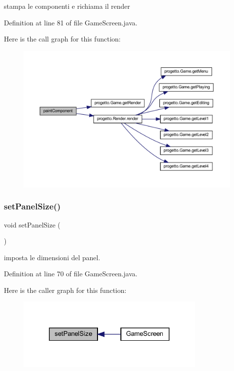 stampa le componenti e richiama il render 



Definition at line 81 of file Game\+Screen.\+java.

Here is the call graph for this function\+:\nopagebreak
\begin{figure}[H]
\begin{center}
\leavevmode
\includegraphics[width=350pt]{classprogetto_1_1_game_screen_aac9233d06f3c093fc37139d7d2b258f6_cgraph}
\end{center}
\end{figure}
\mbox{\label{classprogetto_1_1_game_screen_aa43131fafd2ebfcce65253a669a29493}} 
\subsubsection{\texorpdfstring{set\+Panel\+Size()}{setPanelSize()}}
{\footnotesize\ttfamily void set\+Panel\+Size (\begin{DoxyParamCaption}{ }\end{DoxyParamCaption})\hspace{0.3cm}{\ttfamily [private]}}



imposta le dimensioni del panel. 



Definition at line 70 of file Game\+Screen.\+java.

Here is the caller graph for this function\+:\nopagebreak
\begin{figure}[H]
\begin{center}
\leavevmode
\includegraphics[width=264pt]{classprogetto_1_1_game_screen_aa43131fafd2ebfcce65253a669a29493_icgraph}
\end{center}
\end{figure}


